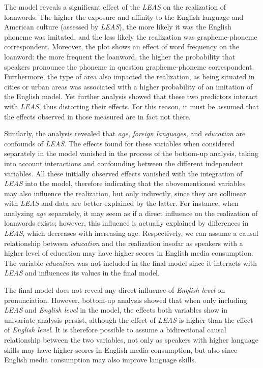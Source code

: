 \documentclass[output=paper]{langscibook}
\begin{document}
The model reveals a significant effect of the \textit{\gls*{LEAS}} on the realization of loanwords. The higher the exposure and affinity to the English language and American culture (assessed by \textit{\gls*{LEAS}}), the more likely it was the English phoneme was imitated, and the less likely the realization was grapheme-phoneme correspondent. 
Moreover, the plot shows an effect of word frequency on the loanword: the more frequent the loanword, the higher the probability that speakers pronounce the phoneme in question grapheme-phoneme correspondent. Furthermore, the type of area also impacted the realization, as being situated in cities or urban areas was associated with a higher probability of an imitation of the English model. Yet further analysis showed that these two predictors interact with \textit{\gls*{LEAS}}, thus distorting their effects. For this reason, it must be assumed that the effects observed in those measured are in fact not there.

Similarly, the analysis revealed that \textit{age}, \textit{foreign languages,} and \textit{education} are confounds of \textit{\gls*{LEAS}}. The effects found for these variables when considered separately in the model vanished in the process of the bottom-up analysis, taking into account interactions and confounding between the different independent variables. All these initially observed effects vanished with the integration of \textit{\gls*{LEAS}} into the model, therefore indicating that the abovementioned variables may also influence the realization, but only indirectly, since they are collinear with \textit{\gls*{LEAS}} and data are better explained by the latter.
For instance, when analyzing \textit{age} separately, it may seem as if a direct influence on the realization of loanwords exists; however, this influence is actually explained by differences in \textit{\gls*{LEAS}}, which decreases with increasing age. Respectively, we can assume a causal relationship between \textit{education} and the realization insofar as speakers with a higher level of education may have higher scores in English media consumption. 
The variable \textit{education} was not included in the final model since it interacts with \textit{\gls*{LEAS}} and influences its values in the final model.

The final model does not reveal any direct influence of \textit{English level} on pronunciation. However, bottom-up analysis showed that when only including \textit{\gls*{LEAS}} and \textit{English level} in the model, the effects both variables show in univariate analysis persist, although the effect of \textit{\gls*{LEAS}} is higher than the effect of \textit{English level}. It is therefore possible to assume a bidirectional causal relationship between the two variables, not only as speakers with higher language skills may have higher scores in English media consumption, but also since English media consumption may also improve language skills.
\end{document}
